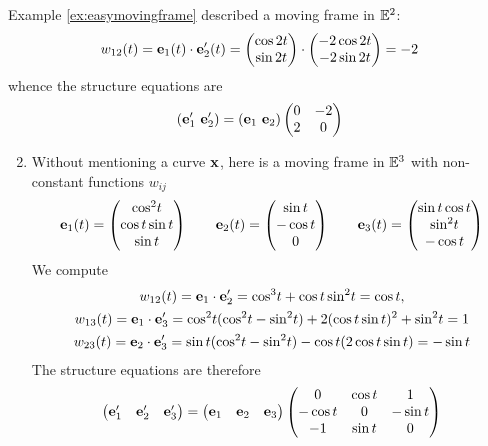 \begin{examples}{}{}
\exstart Example \ref{ex:easymovingframe} described a moving frame in $\mathbb{E}^2$:
	\[w_{12}(t)={\mathbf{e}}_1(t)\cdot {\mathbf{e}}_2'(t)=\begin{pmatrix}\cos 2t\\\sin 2t\end{pmatrix}\cdot\begin{pmatrix}-2\cos 2t\\-2\sin 2t\end{pmatrix}=-2\]
	whence the structure equations are
	\[({\mathbf{e}}_1'\ {\mathbf{e}}_2')=({\mathbf{e}}_1\ {\mathbf{e}}_2)\begin{pmatrix}
	0&-2\\
	2&0
	\end{pmatrix}\]
\begin{enumerate}\setcounter{enumi}{1}
	\item Without mentioning a curve ${\mathbf{x}}$, here is a moving frame in $\mathbb{E}^3$ with non-constant functions $w_{ij}$
	\[{\mathbf{e}}_1(t)=\begin{pmatrix}\cos^2\!t\\\cos t\sin t\\\sin t\end{pmatrix}\qquad {\mathbf{e}}_2(t)=\begin{pmatrix}\sin t\\-\cos t\\0\end{pmatrix}\qquad {\mathbf{e}}_3(t)=\begin{pmatrix}\sin t\cos t\\\sin^2\!t\\-\cos t\end{pmatrix}\]
	We compute
	\begin{gather*}
	w_{12}(t) =\ve_1\cdot\ve_2' =\cos^3\!t+\cos t\sin^2\!t =\cos t,\\
	w_{13}(t) =\ve_1\cdot\ve_3' =\cos^2\!t(\cos^2\!t-\sin^2\!t)+2(\cos t\sin t)^2+\sin^2\!t =1\\
	w_{23}(t) =\ve_2\cdot\ve_3' =\sin t(\cos^2\!t-\sin^2\!t)-\cos t(2\cos t\sin t) =-\sin t
	\end{gather*}
	The structure equations are therefore
	\[\begin{pmatrix}
  {\mathbf{e}}_1'&{\mathbf{e}}_2'&{\mathbf{e}}_3'
  \end{pmatrix}=
	\begin{pmatrix}
	{\mathbf{e}}_1&{\mathbf{e}}_2&{\mathbf{e}}_3
	\end{pmatrix}
	\begin{pmatrix}
	0&\cos t&1\\
	-\cos t&0&-\sin t\\
	-1&\sin t&0
	\end{pmatrix}\]
\end{enumerate}
\end{examples}

